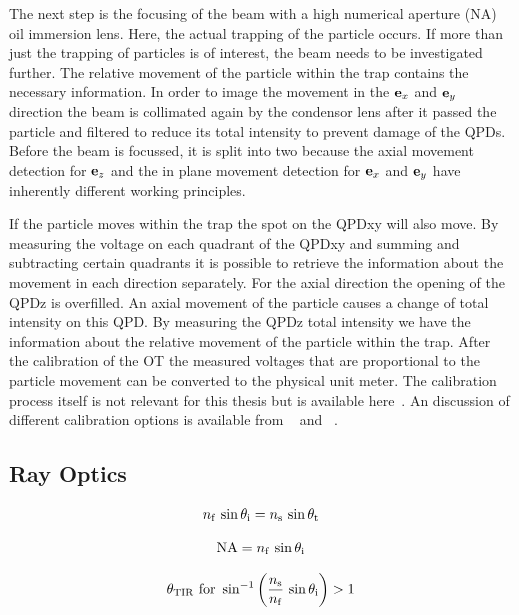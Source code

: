 The next step is the focusing of the beam with a high numerical aperture (NA) 
oil immersion lens. Here, the actual trapping of the particle occurs. If more 
than just the trapping of particles is of interest, the beam needs to be 
investigated further. The relative movement of the particle within the trap 
contains the necessary information. In order to image the movement in the $\vb{e}_{x}$ 
and $\vb{e}_{y}$ direction the beam is collimated again by the condensor lens after it 
passed the particle and filtered to reduce its total intensity to prevent 
damage of the QPDs. Before the beam is focussed, it is split into two because 
the axial movement detection for $\vb{e}_{z}$ and the in plane movement detection for 
$\vb{e}_{x}$ and $\vb{e}_{y}$ have inherently different working principles.

If the particle moves within the trap the spot on the QPDxy will also move. By 
measuring the voltage on each quadrant of the QPDxy and summing and subtracting 
certain quadrants it is possible to retrieve the information about the movement 
in each direction separately. For the axial direction the opening of the QPDz 
is overfilled. An axial movement of the particle causes a change of total 
intensity on this QPD. By measuring the QPDz total intensity we have the 
information about the relative movement of the particle within the trap. After 
the calibration of the OT the measured voltages that are proportional to the 
particle movement can be converted to the physical unit meter. The calibration 
process itself is not relevant for this thesis but is available 
here~\cite{Lamprecht2017}. An discussion of different calibration options is 
available from \citeauthor{Svoboda1994}~\cite{Svoboda1994} and 
\citeauthor{Jun2004}~\cite{Jun2004}.

\subsection{Ray Optics\label{sec:Th-rayoptics}}

\cite[Chapter 7]{Jackson2013}

\begin{equation}
  n_{\mathrm{f}}\,\sin\theta_{\mathrm{i}} = n_{\mathrm{s}}\,\sin\theta_{\mathrm{t}}
  \label{eq:Th-Snell}
\end{equation}

\begin{equation}
  \text{NA} = n_{\mathrm{f}}\,\sin\theta_{\mathrm{i}}
  \label{eq:Th-NA}
\end{equation}

\begin{equation}
  \theta_{\mathrm{TIR}} \text{~for~} \sin^{-1}\left( \frac{n_{\mathrm{s}}}{n_{\mathrm{f}}}\,\sin\theta_{\mathrm{i}} 
  \right) > 1
  \label{eq:Th-TIR}
\end{equation}

